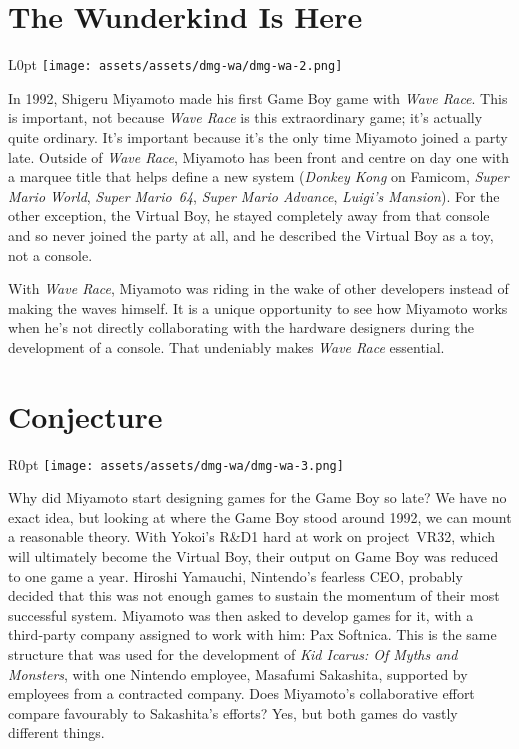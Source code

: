 \documentclass{book}
\begin{document}
\newpage\FloatBarrier\needspace{10mm}\section*{The Wunderkind Is Here}\nopagebreak[4]
\begin{wrapfigure}{L}{0pt} \texttt{[image: assets/assets/dmg-wa/dmg-wa-2.png]}\end{wrapfigure}
In 1992, Shigeru Miyamoto made his first Game Boy game with \emph{Wave Race}. This is important, not because \emph{Wave Race} is this extraordinary game; it’s actually quite ordinary. It’s important because it’s the only time Miyamoto joined a party late. Outside of \emph{Wave Race}, Miyamoto has been front and centre on day one with a marquee title that helps define a new system (\emph{Donkey Kong} on Famicom, \emph{Super Mario World}, \emph{Super Mario 64}, \emph{Super Mario Advance}, \emph{Luigi’s Mansion}). For the other exception, the Virtual Boy, he stayed completely away from that console and so never joined the party at all, and he described the Virtual Boy as a toy, not a console.

With \emph{Wave Race}, Miyamoto was riding in the wake of other developers instead of making the waves himself. It is a unique opportunity to see how Miyamoto works when he’s not directly collaborating with the hardware designers during the development of a console. That undeniably makes \emph{Wave Race} essential.

\FloatBarrier\needspace{10mm}\section*{Conjecture}\nopagebreak[4]

\begin{wrapfigure}{R}{0pt} \texttt{[image: assets/assets/dmg-wa/dmg-wa-3.png]}\end{wrapfigure}
Why did Miyamoto start designing games for the Game Boy so late? We have no exact idea, but looking at where the Game Boy stood around 1992, we can mount a reasonable theory. With Yokoi’s R\&D1 hard at work on project VR32, which will ultimately become the Virtual Boy, their output on Game Boy was reduced to one game a year. Hiroshi Yamauchi, Nintendo’s fearless CEO, probably decided that this was not enough games to sustain the momentum of their most successful system. Miyamoto was then asked to develop games for it, with a third-party company assigned to work with him: Pax Softnica. This is the same structure that was used for the development of \emph{Kid Icarus: Of Myths and Monsters}, with one Nintendo employee, Masafumi Sakashita, supported by employees from a contracted company. Does Miyamoto’s collaborative effort compare favourably to Sakashita’s efforts? Yes, but both games do vastly different things.
\end{document}
